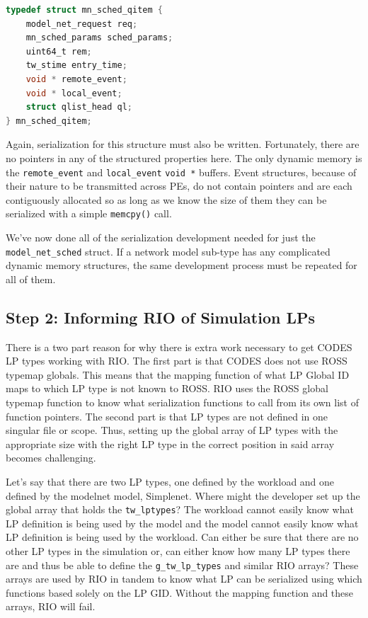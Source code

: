 \documentclass[letterpaper, 11 pt, conference]{IEEEtran}
\begin{document}
\begin{lstlisting}[language=C]
typedef struct mn_sched_qitem {
	model_net_request req;
	mn_sched_params sched_params;
	uint64_t rem;
	tw_stime entry_time;
	void * remote_event;
	void * local_event;
	struct qlist_head ql;
} mn_sched_qitem;
\end{lstlisting}

Again, serialization for this structure must also be written. Fortunately, there are no pointers in any of the structured properties here. The only dynamic memory is the \texttt{remote\_event} and \texttt{local\_event} \texttt{void *} buffers. Event structures, because of their nature to be transmitted across PEs, do not contain pointers and are each contiguously allocated so as long as we know the size of them they can be serialized with a simple \texttt{memcpy()} call. 

We've now done all of the serialization development needed for just the \texttt{model\_net\_sched} struct. If a network model sub-type has any complicated dynamic memory structures, the same development process must be repeated for all of them.


\subsection{Step 2: Informing RIO of Simulation LPs}
There is a two part reason for why there is extra work necessary to get CODES LP types working with RIO. The first part is that CODES does not use ROSS typemap globals. This means that the mapping function of what LP Global ID maps to which LP type is not known to ROSS. RIO uses the ROSS global typemap function to know what serialization functions to call from its own list of function pointers. The second part is that LP types are not defined in one singular file or scope. Thus, setting up the global array of LP types with the appropriate size with the right LP type in the correct position in said array becomes challenging.

Let's say that there are two LP types, one defined by the workload and one defined by the modelnet model, Simplenet. Where might the developer set up the global array that holds the \texttt{tw\_lptypes}? The workload cannot easily know what LP definition is being used by the model and the model cannot easily know what LP definition is being used by the workload. Can either be sure that there are no other LP types in the simulation or, can either know how many LP types there are and thus be able to define the \texttt{g\_tw\_lp\_types} and similar RIO arrays? These arrays are used by RIO in tandem to know what LP can be serialized using which functions based solely on the LP GID. Without the mapping function and these arrays, RIO will fail.
\end{document}
